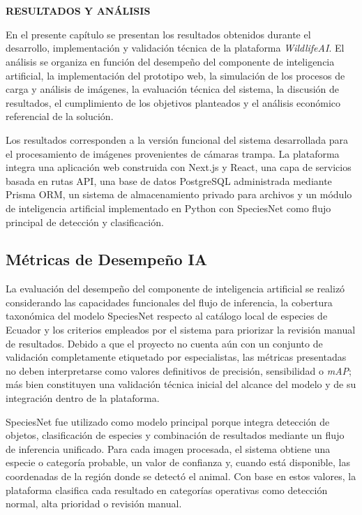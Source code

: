 \chapter{}
\begin{center}
\textbf{RESULTADOS Y ANÁLISIS}
\end{center}

En el presente capítulo se presentan los resultados obtenidos durante el desarrollo, implementación y validación técnica de la plataforma \textit{WildlifeAI}. El análisis se organiza en función del desempeño del componente de inteligencia artificial, la implementación del prototipo web, la simulación de los procesos de carga y análisis de imágenes, la evaluación técnica del sistema, la discusión de resultados, el cumplimiento de los objetivos planteados y el análisis económico referencial de la solución.

Los resultados corresponden a la versión funcional del sistema desarrollada para el procesamiento de imágenes provenientes de cámaras trampa. La plataforma integra una aplicación web construida con Next.js y React, una capa de servicios basada en rutas API, una base de datos PostgreSQL administrada mediante Prisma ORM, un sistema de almacenamiento privado para archivos y un módulo de inteligencia artificial implementado en Python con SpeciesNet como flujo principal de detección y clasificación.

\section{Métricas de Desempeño IA}
\label{sec:metricas_desempeno_ia}

La evaluación del desempeño del componente de inteligencia artificial se realizó considerando las capacidades funcionales del flujo de inferencia, la cobertura taxonómica del modelo SpeciesNet respecto al catálogo local de especies de Ecuador y los criterios empleados por el sistema para priorizar la revisión manual de resultados. Debido a que el proyecto no cuenta aún con un conjunto de validación completamente etiquetado por especialistas, las métricas presentadas no deben interpretarse como valores definitivos de precisión, sensibilidad o \textit{mAP}; más bien constituyen una validación técnica inicial del alcance del modelo y de su integración dentro de la plataforma.

SpeciesNet fue utilizado como modelo principal porque integra detección de objetos, clasificación de especies y combinación de resultados mediante un flujo de inferencia unificado. Para cada imagen procesada, el sistema obtiene una especie o categoría probable, un valor de confianza y, cuando está disponible, las coordenadas de la región donde se detectó el animal. Con base en estos valores, la plataforma clasifica cada resultado en categorías operativas como detección normal, alta prioridad o revisión manual.

